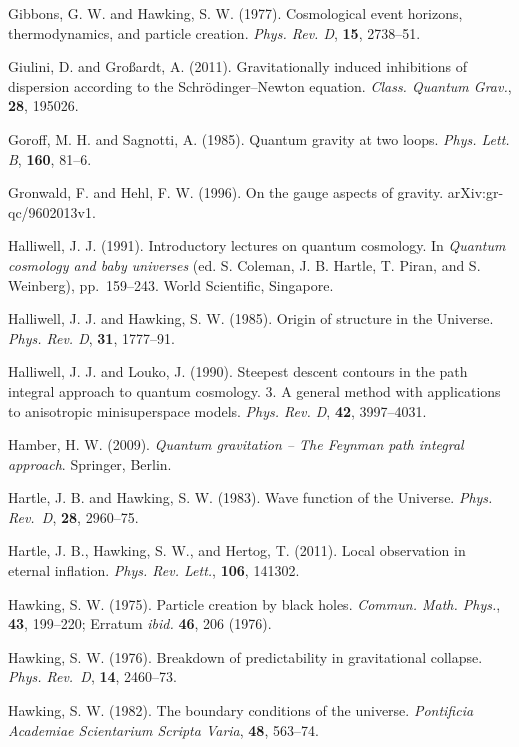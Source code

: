 \documentclass[12pt]{article}
\begin{document}
\bibitem{} Gibbons, G. W. and Hawking, S. W. (1977).  Cosmological
  event horizons, thermodynamics, and particle creation. {\em
    Phys. Rev. D}, {\bf 15}, 2738--51. 

\bibitem{} Giulini, D. and Gro\ss ardt, A. (2011). 
          Gravitationally induced inhibitions of dispersion according
          to the Schr\"odinger--Newton equation. 
          {\em Class. Quantum Grav.}, {\bf 28}, 195026.

\bibitem{} Goroff, M. H. and Sagnotti, A. (1985). Quantum gravity at two loops.
           {\em Phys. Lett. B}, {\bf 160}, 81--6.

\bibitem{} Gronwald, F. and Hehl, F. W. (1996).  On the gauge aspects
           of gravity. arXiv:gr-qc/9602013v1. 

\bibitem{} Halliwell, J. J. (1991). Introductory lectures on quantum cosmology.
           In {\em Quantum cosmology and baby universes} (ed. S. Coleman,
           J. B. Hartle, T. Piran, and S. Weinberg), pp.~159--243.
           World Scientific, Singapore.

\bibitem{} Halliwell, J. J. and Hawking, S. W. (1985). 
           Origin of structure in the
           Universe. {\em Phys. Rev. D}, {\bf 31}, 1777--91.

\bibitem{} Halliwell, J. J. and Louko, J. (1990). 
           Steepest descent contours in the path integral approach 
    to quantum cosmology. 3. A general method with applications to anisotropic
    minisuperspace models. {\em Phys. Rev. D}, {\bf 42}, 3997--4031.


\bibitem{} Hamber, H. W. (2009). {\em Quantum gravitation -- The Feynman
       path integral approach}. Springer, Berlin.

\bibitem{} Hartle, J. B. and Hawking, S. W. (1983). Wave function of the
           Universe. {\em Phys. Rev.~D}, {\bf 28}, 2960--75.

\bibitem{} Hartle, J. B., Hawking, S. W., and Hertog, T. (2011).
 Local observation in eternal inflation. {\em Phys. Rev. Lett.}, {\bf
   106}, 141302.

\bibitem{} Hawking, S. W. (1975). Particle creation by black holes.
           {\em Commun. Math. Phys.}, {\bf 43}, 199--220; Erratum {\em
           ibid.} {\bf 46}, 206 (1976).

\bibitem{} Hawking, S. W. (1976). Breakdown of predictability in
  gravitational collapse. {\em Phys. Rev.~D}, {\bf 14}, 2460--73. 

\bibitem{} Hawking, S. W. (1982). The boundary conditions of the universe.
           {\em Pontificia Academiae Scientarium Scripta Varia},
           {\bf 48}, 563--74.
\end{document}
